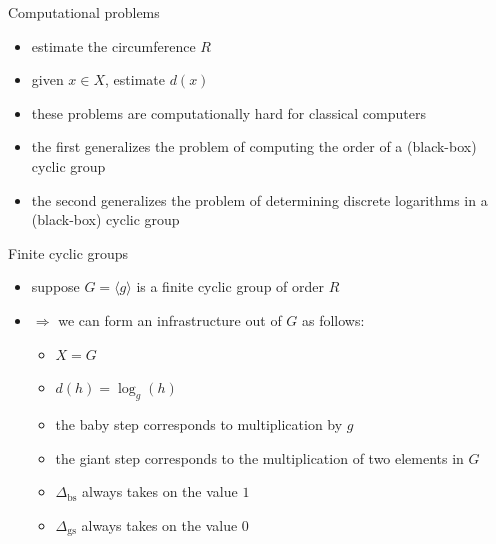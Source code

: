\documentclass[slideColor]{prosper}
\renewcommand{\>}{\rangle}
\newcommand{\<}{\langle}
\begin{document}
\begin{slide}{Computational problems}
\vspace{-0.25cm}
\begin{itemize}
\item estimate the circumference $R$

\medskip
\item given $x\in X$, estimate $d(x)$

\bigskip
\item these problems are computationally hard for classical computers

\medskip
\item the first generalizes the problem of computing the order of a (black-box) cyclic group

\medskip
\item the second generalizes the problem of determining discrete logarithms in a (black-box) cyclic group
\end{itemize}
\end{slide}


\begin{slide}{Finite cyclic groups}
\vspace{-0.25cm}
\begin{itemize}
\item suppose $G=\<g\>$ is a finite cyclic group of order $R$

\medskip
\item $\Rightarrow$ we can form an infrastructure out of $G$ as follows:

\begin{itemize}
\item $X=G$

\medskip
\item $d(h) = \log_g(h)$ 

\medskip
\item the baby step corresponds to multiplication by $g$

\medskip
\item the giant step corresponds to the multiplication of two elements in $G$

\medskip
\item $\Delta_{\mathrm{bs}}$ always takes on the value $1$

\medskip 
\item $\Delta_{\mathrm{gs}}$ always takes on the value $0$
\end{itemize}
\end{itemize}
\end{slide}
\end{document}
